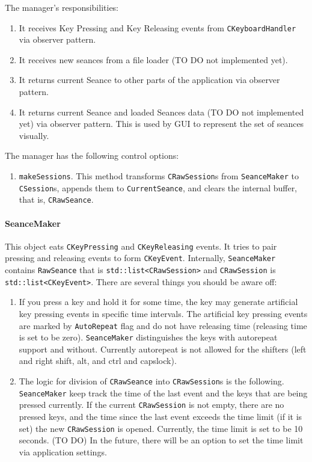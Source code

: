 \documentclass{article}
\begin{document}
The manager's responsibilities:
\begin{enumerate}
\item It receives Key Pressing and Key Releasing events from \verb"CKeyboardHandler" via observer pattern.

\item It receives new seances from a file loader (TO DO not implemented yet).

\item It returns current Seance to other parts of the application via observer pattern.

\item It returns current Seance and loaded Seances data (TO DO not implemented yet) via observer pattern. This is used by GUI to represent the set of seances visually.
\end{enumerate}

The manager has the following control options:
\begin{enumerate}
\item \verb"makeSessions". This method transforms \verb"CRawSession"s from \verb"SeanceMaker" to \verb"CSession"s, appends them to \verb"CurrentSeance", and clears the internal buffer, that is, \verb"CRawSeance".
\end{enumerate}

\paragraph{SeanceMaker}
This object eats \verb"CKeyPressing" and \verb"CKeyReleasing" events. It tries to pair pressing and releasing events to form \verb"CKeyEvent". Internally, \verb"SeanceMaker" contains \verb"RawSeance" that is \verb"std::list<CRawSession>" and \verb"CRawSession" is \verb"std::list<CKeyEvent>". There are several things you should be aware off:
\begin{enumerate}
\item If you press a key and hold it for some time, the key may generate artificial key pressing events in specific time intervals. The artificial key pressing events are marked by \verb"AutoRepeat" flag and do not have releasing time (releasing time is set to be zero). \verb"SeanceMaker" distinguishes the keys with autorepeat support and without. Currently autorepeat is not allowed for the shifters (left and right shift, alt, and ctrl and capslock).

\item The logic for division of \verb"CRawSeance" into \verb"CRawSession"s is the following. \verb"SeanceMaker" keep track the time of the last event and the keys that are being pressed currently. If the current \verb"CRawSession" is not empty, there are no pressed keys, and the time since the last event exceeds the time limit (if it is set) the new \verb"CRawSession" is opened. Currently, the time limit is set to be 10 seconds. (TO DO) In the future, there will be an option to set the time limit via application settings.
\end{enumerate}
\end{document}
